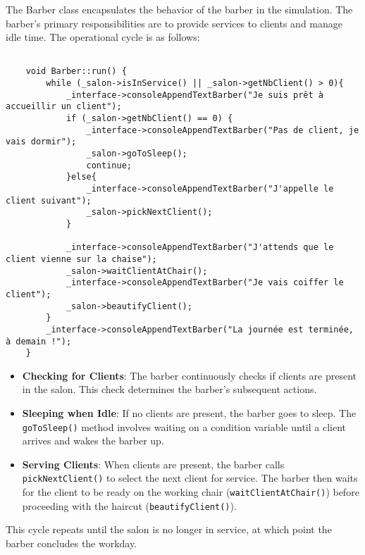 \documentclass{article}
\begin{document}
    The Barber class encapsulates the behavior of the barber in the simulation. The barber's primary responsibilities are to provide services to clients and manage idle time. The operational cycle is as follows:

    \begin{lstlisting}[caption={The barber operational cycle}, captionpos=b, label=lst:1]

    void Barber::run() {
        while (_salon->isInService() || _salon->getNbClient() > 0){
            _interface->consoleAppendTextBarber("Je suis prêt à accueillir un client");
            if (_salon->getNbClient() == 0) {
                _interface->consoleAppendTextBarber("Pas de client, je vais dormir");
                _salon->goToSleep();
                continue;
            }else{
                _interface->consoleAppendTextBarber("J'appelle le client suivant");
                _salon->pickNextClient();
            }

            _interface->consoleAppendTextBarber("J'attends que le client vienne sur la chaise");
            _salon->waitClientAtChair();
            _interface->consoleAppendTextBarber("Je vais coiffer le client");
            _salon->beautifyClient();
        }
        _interface->consoleAppendTextBarber("La journée est terminée, à demain !");
    }

    \end{lstlisting}

    \begin{itemize}
    \item \textbf{Checking for Clients}: The barber continuously checks if clients are present in the salon. This check determines the barber's subsequent actions.
    \item \textbf{Sleeping when Idle}: If no clients are present, the barber goes to sleep. The \texttt{goToSleep()} method involves waiting on a condition variable until a client arrives and wakes the barber up.
    \item \textbf{Serving Clients}: When clients are present, the barber calls \texttt{pickNextClient()} to select the next client for service. The barber then waits for the client to be ready on the working chair (\texttt{waitClientAtChair()}) before proceeding with the haircut (\texttt{beautifyClient()}).
    \end{itemize}

    This cycle repeats until the salon is no longer in service, at which point the barber concludes the workday.
\end{document}
